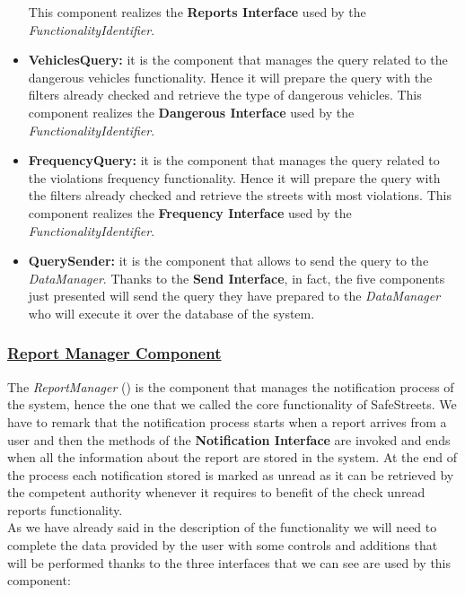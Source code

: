 \begin{itemize}
				This component realizes the \textbf{Reports Interface} used by the \emph{FunctionalityIdentifier}.
				
				\item \textbf{VehiclesQuery:} it is the component that manages the query related to the dangerous vehicles functionality. Hence it will prepare the query with the filters already checked and retrieve the type of dangerous vehicles. This component realizes the \textbf{Dangerous Interface} used by the \emph{FunctionalityIdentifier}.
				
				\item \textbf{FrequencyQuery:} it is the component that manages the query related to the violations frequency functionality. Hence it will prepare the query with the filters already checked and retrieve the streets with most violations. This component realizes the \textbf{Frequency Interface} used by the \emph{FunctionalityIdentifier}.
				
				\item \textbf{QuerySender:} it is the component that allows to send the query to the \emph{DataManager}. Thanks to the \textbf{Send Interface}, in fact, the five components just presented will send the query they have prepared to the \emph{DataManager} who will execute it over the database of the system.
			\end{itemize}
		
		\subsubsection[Report Manager Component]{\hyperlink{toc}{Report Manager Component}}
			\label{sec:reportManagerComponent}
			
			The \emph{ReportManager} () is the component that manages the notification process of the system, hence the one that we called the core functionality of SafeStreets. We have to remark that the notification process starts when a report arrives from a user and then the methods of the \textbf{Notification Interface} are invoked and ends when all the information about the report are stored in the system. At the end of the process each notification stored is marked as unread as it can be retrieved by the competent authority whenever it requires to benefit of the check unread reports functionality.\\
			
			As we have already said in the description of the functionality we will need to complete the data provided by the user with some controls and additions that will be performed thanks to the three interfaces that we can see are used by this component:
			
